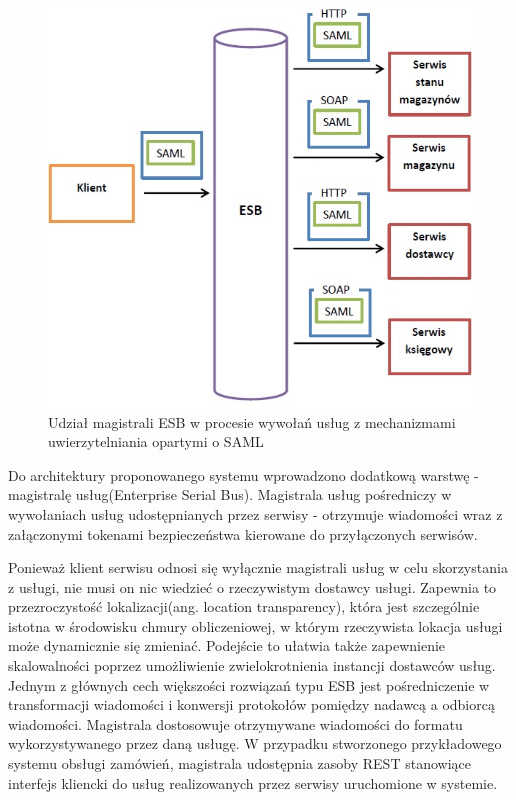 \label{sec:integracja}

		\begin{figure}[h]
			\centering
			\includegraphics{img/esbAndSAML.jpg}
			\caption{Udział magistrali ESB w procesie wywołań usług z mechanizmami uwierzytelniania opartymi o SAML}
			\label{ESB i SAML}
		\end{figure}

		Do architektury proponowanego systemu wprowadzono dodatkową warstwę - magistralę usług(Enterprise Serial Bus). Magistrala usług pośredniczy w wywołaniach usług udostępnianych przez serwisy - otrzymuje wiadomości wraz z załączonymi tokenami bezpieczeństwa kierowane do przyłączonych serwisów. 
		
		Ponieważ klient serwisu odnosi się wyłącznie magistrali usług w celu skorzystania z usługi, nie musi on nic wiedzieć o rzeczywistym dostawcy usługi. Zapewnia to przezroczystość lokalizacji(ang. location transparency), która jest szczególnie istotna w środowisku chmury obliczeniowej, w którym rzeczywista lokacja usługi może dynamicznie się zmieniać. Podejście to ułatwia także zapewnienie skalowalności poprzez umożliwienie zwielokrotnienia instancji dostawców usług.
		Jednym z głównych cech większości rozwiązań typu ESB jest pośredniczenie w transformacji wiadomości i konwersji protokołów pomiędzy nadawcą a odbiorcą wiadomości. Magistrala dostosowuje otrzymywane wiadomości do formatu wykorzystywanego przez daną usługę. W przypadku stworzonego przykładowego systemu obsługi zamówień, magistrala udostępnia zasoby REST stanowiące interfejs kliencki do usług realizowanych przez serwisy uruchomione w systemie.
		
